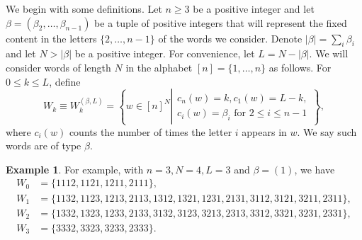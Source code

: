 \documentclass[11pt]{article}
\theoremstyle{definition}
\newtheorem{example}[theo]{Example}
\numberwithin{equation}{section}
\begin{document}
We begin with some definitions. Let $n \geq 3$ be a positive integer and let $\beta = (\beta_2,\dots, \beta_{n-1})$ be a tuple of positive integers that will represent the fixed content in the letters $\{2,\ldots,n-1\}$ of the words we consider. 
Denote $|\beta| = \sum_i \beta_i$ and let $N > |\beta|$ be a positive integer. For convenience, let $L = N - |\beta|$.
We will consider words of length $N$ in the alphabet $[n] = \{1,\dots, n\}$ as follows. For $0 \leq k \leq L$, define
\begin{equation}
\label{wk-def}
W_k \equiv W^{(\beta,L)}_k = \left\{ w \in [n]^N 
\left| 
\begin{matrix}
c_n(w) = k, c_1(w) = L-k,  \\
c_i(w) = \beta_i \text{ for } 2 \leq i \leq n-1
\end{matrix}  
\right. \right\},
\end{equation}
where $c_i(w)$ counts the number of times the letter $i$ appears in $w$. We say such words are of type $\beta$.

\begin{example}
\label{eg:Wk}
For example, with $n=3, N = 4, L = 3$ and $\beta = (1)$, we have
\begin{equation}
\label{Wk-eg}
\begin{split}
W_0 &= \{1112, 1121, 1211, 2111\}, \\
W_1 &= \{1132, 1123, 1213, 2113,1312, 1321, 1231, 2131,3112, 3121, 3211, 2311\}, \\
W_2 &= \{1332, 1323, 1233, 2133,3132, 3123, 3213, 2313,3312, 3321, 3231, 2331\},\\
W_3 &= \{3332, 3323, 3233, 2333\}.
\end{split}
\end{equation}
\end{example}
\end{document}
